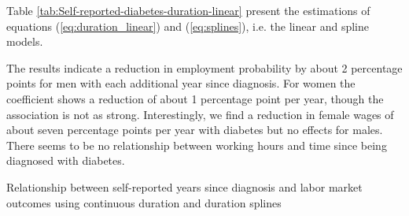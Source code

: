 \documentclass[12pt,english,british]{article}
\begin{document}
\FloatBarrier

Table \ref{tab:Self-reported-diabetes-duration-linear} present the estimations of equations (\ref{eq:duration_linear}) and (\ref{eq:splines}), i.e. the linear and spline models. 

The  results indicate a reduction in employment probability by about 2 percentage points for men with each
additional year since diagnosis. For women the coefficient shows a
reduction of about 1 percentage point per year, though the association
is not as strong. Interestingly, we find a reduction in female wages of about seven percentage points per year with diabetes but no effects for males. There seems to be no relationship between working hours and time since being diagnosed with diabetes.
\begin{table}[h]
\caption{\label{tab:Self-reported-diabetes-duration-linear}Relationship between self-reported years since diagnosis and labor market outcomes using continuous duration and duration splines}
\begin{center}
\begin{adjustbox}{max width=\textwidth}


\end{adjustbox}
\end{center}
\end{table}
\end{document}
